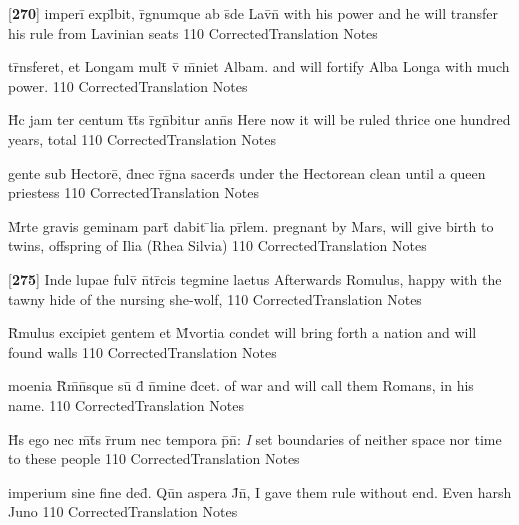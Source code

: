 \latline
  {[\textbf{270}] imperi\={} expl\={}bit, r\={}gnumque ab s\={}de Lav\={\macron {\i}}n\={\macron {\i}}}
  { with his power and he will transfer his rule from Lavinian seats }
  {110}
  { CorrectedTranslation }
  { Notes }


\latline
  {tr\={}nsferet, et Longam mult\={} v\={\macron {\i}} m\={}niet Albam.}
  { and will fortify Alba Longa with much power. }
  {110}
  { CorrectedTranslation }
  { Notes }


\latline
  {H\={\macron {\i}}c jam ter centum t\={}t\={}s r\={}gn\={}bitur ann\={}s }
  { Here now it will be ruled thrice one hundred years, total }
  {110}
  { CorrectedTranslation }
  { Notes }


\latline
  {gente sub Hectore\={}, d\={}nec r\={}g\={\macron {\i}}na sacerd\={}s}
  { under the Hectorean clean until a queen priestess }
  {110}
  { CorrectedTranslation }
  { Notes }


\latline
  {M\={}rte gravis geminam part\={} dabit \={}lia pr\={}lem.}
  { pregnant by Mars, will give birth to twins, offspring of Ilia (Rhea Silvia) }
  {110}
  { CorrectedTranslation }
  { Notes }


\latline
  {[\textbf{275}] Inde lupae fulv\={} n\={}tr\={\macron {\i}}cis tegmine laetus}
  { Afterwards Romulus, happy with the tawny hide of the nursing she-wolf,  }
  {110}
  { CorrectedTranslation }
  { Notes }


\latline
  {R\={}mulus excipiet gentem et M\={}vortia condet}
  { will bring forth a nation and will found walls  }
  {110}
  { CorrectedTranslation }
  { Notes }


\latline
  {moenia R\={}m\={}n\={}sque su\={} d\={} n\={}mine d\={\macron {\i}}cet.}
  { of war and will call them Romans, in his name. }
  {110}
  { CorrectedTranslation }
  { Notes }


\latline
  {H\={\macron {\i}}s ego nec m\={}t\={}s r\={}rum nec tempora p\={}n\={}:}
  { \emph{I} set boundaries of neither space nor time to these people}
  {110}
  { CorrectedTranslation }
  { Notes }


\latline
  {imperium sine fine ded\={\macron {\i}}.  Qu\={\macron {\i}}n aspera J\={}n\={},}
  { I gave them rule without end.  Even harsh Juno }
  {110}
  { CorrectedTranslation }
  { Notes }


